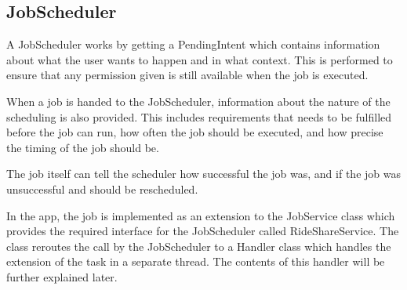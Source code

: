 \subsection{JobScheduler}

A JobScheduler works by getting a PendingIntent which contains information about what the user wants to happen and in what context.
This is performed to ensure that any permission given is still available when the job is executed.

When a job is handed to the JobScheduler, information about the nature of the scheduling is also provided.
This includes requirements that needs to be fulfilled before the job can run, how often the job should be executed, and how precise the timing of the job should be.

The job itself can tell the scheduler how successful the job was, and if the job was unsuccessful and should be rescheduled.

In the app, the job is implemented as an extension to the JobService class which provides the required interface for the JobScheduler called RideShareService.
The class reroutes the call by the JobScheduler to a Handler class which handles the extension of the task in a separate thread.
The contents of this handler will be further explained later. 
